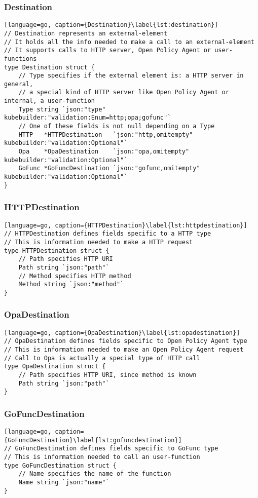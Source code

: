 \subsubsection{Destination}
\begin{lstlisting}[language=go, caption={Destination}\label{lst:destination}]
// Destination represents an external-element
// It holds all the info needed to make a call to an external-element
// It supports calls to HTTP server, Open Policy Agent or user-functions
type Destination struct {
	// Type specifies if the external element is: a HTTP server in general, 
    // a special kind of HTTP server like Open Policy Agent or internal, a user-function
	Type string `json:"type" kubebuilder:"validation:Enum=http;opa;gofunc"`
	// One of these fields is not null depending on a Type
	HTTP   *HTTPDestination   `json:"http,omitempty" kubebuilder:"validation:Optional"`
	Opa    *OpaDestination    `json:"opa,omitempty" kubebuilder:"validation:Optional"`
	GoFunc *GoFuncDestination `json:"gofunc,omitempty" kubebuilder:"validation:Optional"`
}
\end{lstlisting}

\subsubsection{HTTPDestination}
\begin{lstlisting}[language=go, caption={HTTPDestination}\label{lst:httpdestination}]
// HTTPDestination defines fields specific to a HTTP type
// This is information needed to make a HTTP request
type HTTPDestination struct {
	// Path specifies HTTP URI
	Path string `json:"path"`
	// Method specifies HTTP method
	Method string `json:"method"`
}
\end{lstlisting}

\subsubsection{OpaDestination}
\begin{lstlisting}[language=go, caption={OpaDestination}\label{lst:opadestination}]
// OpaDestination defines fields specific to Open Policy Agent type
// This is information needed to make an Open Policy Agent request
// Call to Opa is actually a special type of HTTP call
type OpaDestination struct {
	// Path specifies HTTP URI, since method is known
	Path string `json:"path"`
}
\end{lstlisting}

\subsubsection{GoFuncDestination}
\begin{lstlisting}[language=go, caption={GoFuncDestination}\label{lst:gofuncdestination}]
// GoFuncDestination defines fields specific to GoFunc type
// This is information needed to call an user-function
type GoFuncDestination struct {
	// Name specifies the name of the function
	Name string `json:"name"`
}
\end{lstlisting}

